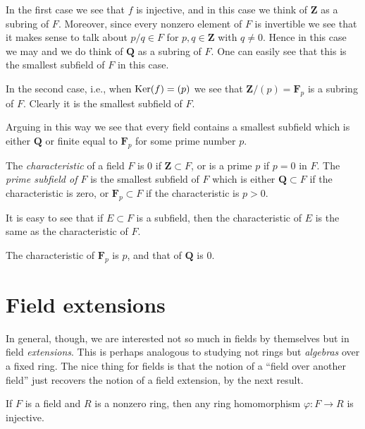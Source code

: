 \medskip\noindent
In the first case we see that $f$ is injective, and in this case
we think of $\mathbf{Z}$ as a subring of $F$. Moreover, since every
nonzero element of $F$ is invertible we see that it makes sense to
talk about $p/q \in F$ for $p, q \in \mathbf{Z}$ with $q \not = 0$.
Hence in this case we may and we do think of $\mathbf{Q}$ as a subring of $F$.
One can easily see that this is the smallest subfield of $F$ in this case.

\medskip\noindent
In the second case, i.e., when $\mathop{\mathrm{Ker}}(f) = (p)$ we see that
$\mathbf{Z}/(p) = \mathbf{F}_p$ is a subring of $F$. Clearly it is the
smallest subfield of $F$.

\medskip\noindent
Arguing in this way we see that every field contains a smallest subfield
which is either $\mathbf{Q}$ or finite equal to $\mathbf{F}_p$ for some
prime number $p$.

\begin{definition}
\label{definition-characteristic}
The {\it characteristic} of a field $F$ is $0$ if
$\mathbf{Z} \subset F$, or is a prime $p$ if $p = 0$ in $F$.
The {\it prime subfield of $F$} is the smallest subfield of $F$
which is either $\mathbf{Q} \subset F$ if the characteristic is zero, or
$\mathbf{F}_p \subset F$ if the characteristic is $p > 0$.
\end{definition}

\noindent
It is easy to see that if $E \subset F$ is a subfield, then the
characteristic of $E$ is the same as the characteristic of $F$.

\begin{example}
\label{example-characteristic}
The characteristic of $\mathbf{F}_p$ is $p$, and that of $\mathbf{Q}$ is $0$.
\end{example}


\section{Field extensions}
\label{section-extensions}

\noindent
In general, though, we are interested not so much in fields by themselves but
in field {\it extensions}. This is perhaps analogous to studying not rings
but {\it algebras} over a fixed ring.
The nice thing for fields is that the notion of a ``field over another field''
just recovers the notion of a field extension, by the next result.

\begin{lemma}
\label{lemma-field-maps-injective}
If $F$ is a field and $R$ is a nonzero ring, then any ring homomorphism
$\varphi : F \to R$ is injective.
\end{lemma}

